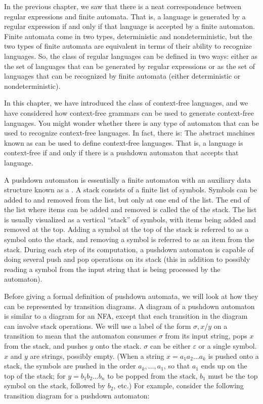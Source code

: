 In the previous chapter, we saw that there is a neat correspondence
between regular expressions and finite automata.  That is, a language
is generated by a regular expression if and only if that language is
accepted by a finite automaton.  Finite automata come in two types,
deterministic and nondeterministic, but the two types of finite
automata are equivalent in terms of their ability to recognize
languages.  So, the class of regular languages can be defined in
two ways: either as the set of languages that can be generated by
regular expressions or as the set of languages that can be recognized
by finite automata (either deterministic or nondeterministic).

In this chapter, we have introduced the class of context-free languages,
and we have considered how context-free grammars can be used to
generate context-free languages.  You might wonder whether there is any
type of automaton that can be used to recognize context-free languages.
In fact, there is:  The abstract machines known as 
 can be used to define
context-free languages.  That is, a language is context-free if and only
if there is a pushdown automaton that accepts that language.

\medbreak

A pushdown automaton is essentially a finite automaton with an auxiliary 
data structure known as a .  A stack consists of
a finite list of symbols.  Symbols can be added to and removed from the
list, but only at one end of the list.  The end of the list where items
can be added and removed is called the  of the stack.
The list is usually visualized as a vertical ``stack'' of symbols,
with items being added and removed at the top.  Adding a symbol at
the top of the stack is referred to as  a symbol onto 
the stack, and removing a symbol is referred to as 
an item from the stack.  During each step of its computation, 
a pushdown automaton is capable of doing several
push and pop operations on its stack (this in addition to possibly reading
a symbol from the input string that is being processed by the automaton).

Before giving a formal definition of pushdown automata, we will look
at how they can be represented by transition diagrams.  A diagram of
a pushdown automaton is similar to a diagram for an NFA, except that
each transition in the diagram can involve stack operations.  We will
use a label of the form $\sigma,x$/$y$ on a transition to mean
that the automaton consumes $\sigma$ from its input string, pops
$x$ from the stack, and pushes $y$ onto the stack.  $\sigma$ can be
either $\varepsilon$ or a single symbol.
$x$ and $y$ are strings, possibly empty. (When a string $x=a_1a_2\dots a_k$ is
pushed onto a stack, the symbols are pushed in the order $a_k,\dots,a_1$, so that
$a_1$ ends up on the top of the stack; for $y=b_1b_2\dots b_n$ to be popped
from the stack, $b_1$ must be the top symbol on the stack, followed by $b_2$, etc.) 
For example, consider the following transition diagram for a pushdown automaton:


